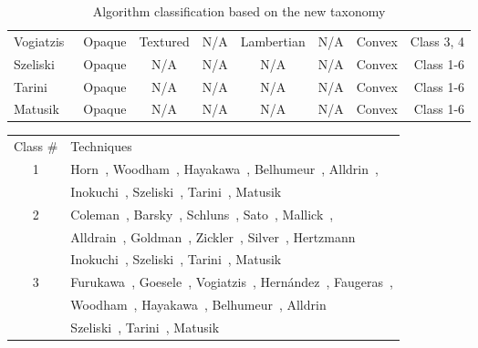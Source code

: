 \begin{sidewaystable}[h]
\begin{tabular}{l*{6}{c}r}
  Vogiatzis~\cite{vogiatzis2007multiview} & Opaque & Textured & N/A & Lambertian & N/A & Convex & Class 3, 4\\
  Szeliski~\cite{szeliski1993rapid} & Opaque & N/A & N/A & N/A & N/A & Convex & Class 1-6\\
  Tarini~\cite{tarini2002marching} & Opaque & N/A & N/A & N/A & N/A & Convex & Class 1-6\\
  Matusik~\cite{matusik2002efficient} & Opaque & N/A & N/A & N/A & N/A & Convex & Class 1-6\\
  \hline
  \end{tabular}
  \caption{Algorithm classification based on the new taxonomy}
  \label{tab:algo_taxo}
\end{sidewaystable}

\begin{sidewaystable}[h]
  \centering
  \begin{tabular}{c||l}
  \hline
  Class \# & Techniques\\
  1 & Horn~\cite{horn1970shape}, Woodham~\cite{woodham1980photometric}, Hayakawa~\cite{hayakawa1994photometric}, Belhumeur~\cite{belhumeur1999bas}, Alldrin~\cite{alldrin2007resolving}, \\
  & Inokuchi~\cite{inokuchi1984range}, Szeliski~\cite{szeliski1993rapid}, Tarini~\cite{tarini2002marching}, Matusik~\cite{matusik2002efficient}\\
  2 & Coleman~\cite{coleman1982obtaining}, Barsky~\cite{barsky20034}, Schluns~\cite{schluns1993photometric}, Sato~\cite{sato1994temporal}, Mallick~\cite{mallick2005beyond}, \\
    & Alldrain~\cite{alldrin2008photometric}, Goldman~\cite{goldman2010shape}, Zickler~\cite{zickler2002helmholtz}, Silver~\cite{silver1980determining}, Hertzmann~\cite{hertzmann2005example}\\
    & Inokuchi~\cite{inokuchi1984range}, Szeliski~\cite{szeliski1993rapid}, Tarini~\cite{tarini2002marching}, Matusik~\cite{matusik2002efficient}\\
  3 & Furukawa~\cite{furukawa2010accurate}, Goesele~\cite{goesele2006multi}, Vogiatzis~\cite{vogiatzis2007multiview}, Hern{\'a}ndez~\cite{esteban2004silhouette}, Faugeras~\cite{faugeras2002variational}, \\
    & Woodham~\cite{woodham1980photometric}, Hayakawa~\cite{hayakawa1994photometric}, Belhumeur~\cite{belhumeur1999bas}, Alldrin~\cite{alldrin2007resolving}\\
    & Szeliski~\cite{szeliski1993rapid}, Tarini~\cite{tarini2002marching}, Matusik~\cite{matusik2002efficient}\\

\end{tabular}
\end{sidewaystable}
